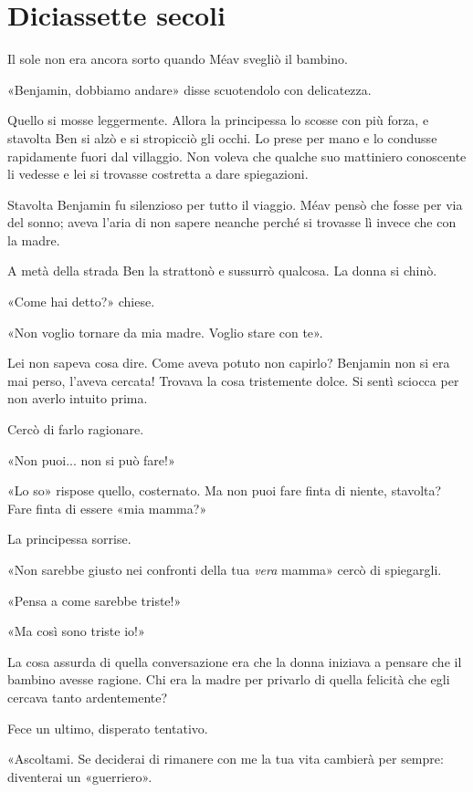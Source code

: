 \chapter{Diciassette secoli}
\label{ch:diciassette-secoli}

Il sole non era ancora sorto quando Méav svegliò il bambino.

«Benjamin, dobbiamo andare» disse scuotendolo con delicatezza.

Quello si mosse leggermente. Allora la principessa lo scosse con più forza, e stavolta Ben si alzò e
si stropicciò gli occhi. Lo prese per mano e lo condusse rapidamente fuori dal villaggio. Non voleva
che qualche suo mattiniero conoscente li vedesse e lei si trovasse costretta a dare spiegazioni.

Stavolta Benjamin fu silenzioso per tutto il viaggio. Méav pensò che fosse per via del sonno; aveva
l'aria di non sapere neanche perché si trovasse lì invece che con la madre.

A metà della strada Ben la strattonò e sussurrò qualcosa. La donna si chinò.

«Come hai detto?» chiese.

«Non voglio tornare da mia madre. Voglio stare con te».

Lei non sapeva cosa dire. Come aveva potuto non capirlo? Benjamin non si era mai perso, l'aveva
cercata! Trovava la cosa tristemente dolce. Si sentì sciocca per non averlo intuito prima.

Cercò di farlo ragionare.

«Non puoi... non si può fare!»

«Lo so» rispose quello, costernato. Ma non puoi fare finta di niente, stavolta? Fare finta di essere
«mia mamma?»

La principessa sorrise.

«Non sarebbe giusto nei confronti della tua \emph{vera} mamma» cercò di spiegargli.

«Pensa a come sarebbe triste!»

«Ma così sono triste io!»

La cosa assurda di quella conversazione era che la donna iniziava a pensare che il bambino avesse
ragione. Chi era la madre per privarlo di quella felicità che egli cercava tanto ardentemente?

Fece un ultimo, disperato tentativo.

«Ascoltami. Se deciderai di rimanere con me la tua vita cambierà per sempre: diventerai un
«guerriero».

